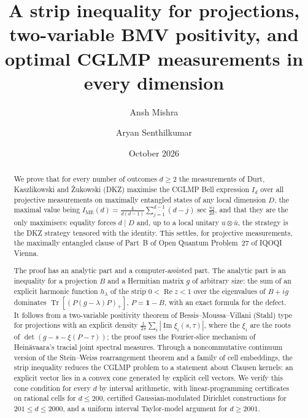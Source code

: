 \documentclass[11pt]{amsart}
\theoremstyle{definition}
\theoremstyle{remark}
\numberwithin{equation}{section}
\newcommand{\Tr}{\operatorname{Tr}}
\renewcommand{\Re}{\operatorname{Re}}
\renewcommand{\Im}{\operatorname{Im}}
\newcommand{\IME}{I_{\mathrm{ME}}}
\newcommand{\one}{\mathbf{1}}
\begin{document}
\title[Optimal CGLMP measurements in every dimension]{A strip inequality for projections, two-variable BMV positivity,
and optimal CGLMP measurements in every dimension}

\author{Ansh Mishra}
\author{Aryan Senthilkumar}

\date{October 2026}



\begin{abstract}
We prove that for every number of outcomes $d\ge2$ the measurements of Durt, Kaszlikowski and \.Zukowski (DKZ)
maximise the CGLMP Bell expression $I_d$ over all projective measurements on maximally entangled states of any local
dimension $D$, the maximal value being $\IME(d)=\frac4{d(d-1)}\sum_{j=1}^{d-1}(d-j)\sec\frac{\pi j}{2d}$, and that
they are the only maximisers: equality forces $d\mid D$ and, up to a local unitary $u\otimes\bar u$, the strategy
is the DKZ strategy tensored with the identity. This settles, for projective measurements, the maximally entangled
clause of Part~B of Open Quantum Problem~27 of IQOQI Vienna.

The proof has an analytic part and a computer-assisted part. The analytic part is an inequality for a projection
$B$ and a Hermitian matrix $g$ of arbitrary size: the sum of an explicit harmonic function $h_\lambda$ of the strip
$0<\Re z<1$ over the eigenvalues of $B+ig$ dominates $\Tr[(P(g-\lambda)P)_+]$, $P=\one-B$, with an exact formula for
the defect. It follows from a two-variable positivity theorem of Bessis--Moussa--Villani (Stahl) type for
projections with an explicit density $\frac1{2\pi}\sum_i|\Im\xi_i(s,\tau)|$, where the $\xi_i$ are the roots of
$\det(g-s-\xi(P-\tau))$; the proof uses the Fourier-slice mechanism of Hein\"avaara's tracial joint spectral
measures. Through a noncommutative continuum version of the Stein--Weiss rearrangement theorem and a family of cell
embeddings, the strip inequality reduces the CGLMP problem to a statement about Clausen kernels: an explicit vector
lies in a convex cone generated by explicit cell vectors. We verify this cone condition for every $d$ by interval
arithmetic, with linear-programming certificates on rational cells for $d\le200$, certified Gaussian-modulated
Dirichlet constructions for $201\le d\le2000$, and a uniform interval Taylor-model argument for $d\ge2001$.


\end{abstract}
\end{document}

